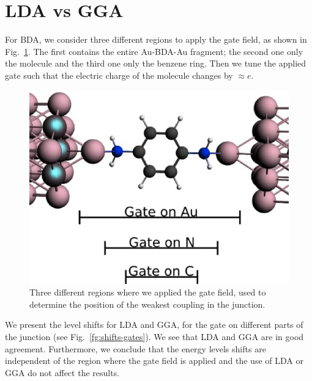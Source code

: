 \documentclass[aip,jcp,a4paper,reprint,floatfix,superscriptaddress]{revtex4-1}
\begin{document}
\section{LDA vs GGA}\label{LDA-vs-GGA}

For BDA, we consider three different regions to apply the gate field, as shown in Fig.~\ref{fg:gates-BDA}. The first contains the entire Au-BDA-Au fragment; the second one only the molecule and the third one only the benzene ring. Then we tune the applied gate such that the electric charge of the molecule changes by $\approx e$. 

\begin{figure}
\includegraphics[width=0.85\columnwidth]{gates} 
\caption{Three different regions where we applied the gate field, used to determine the position of the weakest coupling in the junction.}\label{fg:gates-BDA}
\end{figure}

We present the level shifts for LDA and GGA, for the gate on different parts of the junction (see Fig.~\ref{fg:shifts-gates}). We see that LDA and GGA are in good agreement. Furthermore, we conclude that the energy levels shifts are independent of the region where the gate field is applied and the use of LDA or GGA do not affect the results. 
\end{document}
